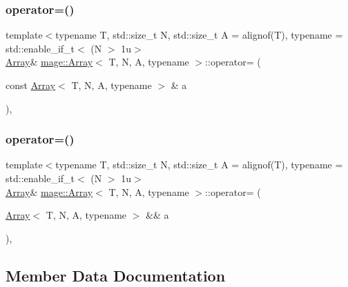 \subsubsection{\texorpdfstring{operator=()}{operator=()}\hspace{0.1cm}{\footnotesize\ttfamily [1/2]}}
{\footnotesize\ttfamily template$<$typename T, std\+::size\+\_\+t N, std\+::size\+\_\+t A = alignof(\+T), typename  = std\+::enable\+\_\+if\+\_\+t$<$ (\+N $>$ 1u$>$ \\
\mbox{\hyperlink{structmage_1_1_array}{Array}}\& \mbox{\hyperlink{structmage_1_1_array}{mage\+::\+Array}}$<$ T, N, A, typename $>$\+::operator= (\begin{DoxyParamCaption}\item[{const \mbox{\hyperlink{structmage_1_1_array}{Array}}$<$ T, N, A, typename $>$ \&}]{a }\end{DoxyParamCaption})\hspace{0.3cm}{\ttfamily [default]}, {\ttfamily [noexcept]}}

\mbox{\label{structmage_1_1_array_a33cb0dac90d7bf6c3973455ab12eb535}} 
\subsubsection{\texorpdfstring{operator=()}{operator=()}\hspace{0.1cm}{\footnotesize\ttfamily [2/2]}}
{\footnotesize\ttfamily template$<$typename T, std\+::size\+\_\+t N, std\+::size\+\_\+t A = alignof(\+T), typename  = std\+::enable\+\_\+if\+\_\+t$<$ (\+N $>$ 1u$>$ \\
\mbox{\hyperlink{structmage_1_1_array}{Array}}\& \mbox{\hyperlink{structmage_1_1_array}{mage\+::\+Array}}$<$ T, N, A, typename $>$\+::operator= (\begin{DoxyParamCaption}\item[{\mbox{\hyperlink{structmage_1_1_array}{Array}}$<$ T, N, A, typename $>$ \&\&}]{a }\end{DoxyParamCaption})\hspace{0.3cm}{\ttfamily [default]}, {\ttfamily [noexcept]}}



\subsection{Member Data Documentation}
\mbox{\label{structmage_1_1_array_ac4dbc8a376d8594b11afa8f1383d4241}} 
